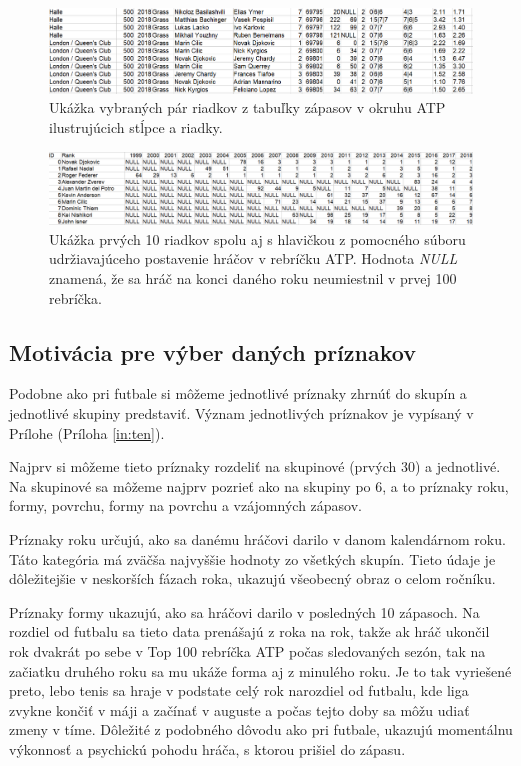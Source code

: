 \noindent
\begin{figure}[b]
\includegraphics[width=\textwidth]{../img/atp.png}
\caption{Ukážka vybraných pár riadkov z tabuľky zápasov v okruhu ATP ilustrujúcich stĺpce a riadky.}
\end{figure}

\noindent
\begin{figure}
\includegraphics[width=\textwidth]{../img/rank.png}
\caption{Ukážka prvých 10 riadkov spolu aj s hlavičkou z pomocného súboru udržiavajúceho postavenie hráčov v rebríčku ATP. Hodnota \textit{NULL} znamená, že sa hráč na konci daného roku neumiestnil v prvej 100 rebríčka.}
\label{rank}
\end{figure}

\subsection{Motivácia pre výber daných príznakov}
Podobne ako pri futbale si môžeme jednotlivé príznaky zhrnúť do skupín a jednotlivé skupiny predstaviť. Význam jednotlivých príznakov je vypísaný v Prílohe (Príloha \ref{in:ten}).

Najprv si môžeme tieto príznaky rozdeliť na skupinové (prvých 30) a jednotlivé.
Na skupinové sa môžeme najprv pozrieť ako na skupiny po 6, a to príznaky roku, formy, povrchu, formy na povrchu a vzájomných zápasov.

Príznaky roku určujú, ako sa danému hráčovi darilo v danom kalendárnom roku.
Táto kategória má zväčša najvyššie hodnoty zo všetkých skupín. Tieto údaje je dôležitejšie v neskorších fázach roka, ukazujú všeobecný obraz o celom ročníku.

Príznaky formy ukazujú, ako sa hráčovi darilo v posledných 10 zápasoch. Na rozdiel od futbalu sa tieto data prenášajú z roka na rok, takže ak hráč ukončil rok dvakrát po sebe v Top 100 rebríčka ATP počas sledovaných sezón, tak na začiatku druhého roku sa mu ukáže forma aj z minulého roku. Je to tak vyriešené preto, lebo tenis sa hraje v podstate celý rok narozdiel od futbalu, kde liga zvykne končiť v máji a začínať v auguste a počas tejto doby sa môžu udiať zmeny v tíme.
Dôležité z podobného dôvodu ako pri futbale, ukazujú momentálnu výkonnosť a psychickú pohodu hráča, s ktorou prišiel do zápasu.

